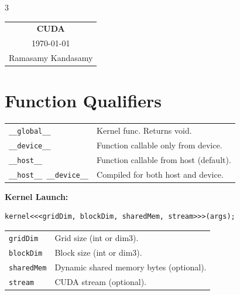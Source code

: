 



\raggedright
\footnotesize
\begin{multicols*}{3}
\setlength{\premulticols}{1pt}
\setlength{\postmulticols}{1pt}
\setlength{\multicolsep}{1pt}
\setlength{\columnsep}{2pt}

\begin{center}
\begin{tabular}{c}
\LARGE{\textbf{CUDA}}\\
\today\\
Ramasamy Kandasamy\\
\end{tabular}
\end{center}


\section*{Function Qualifiers}

\begin{tabularx}{\linewidth}{lX}
\texttt{\_\_global\_\_}               & Kernel func. Returns void. \\
\texttt{\_\_device\_\_}               & Function callable only from device. \\
\texttt{\_\_host\_\_}                 & Function callable from host (default). \\
\texttt{\_\_host\_\_ \_\_device\_\_}  & Compiled for both host and device.\\
\end{tabularx}

\textbf{Kernel Launch:} \texttt{}
\begin{mdframed}[nobreak=true,backgroundcolor=gray!10,linecolor=Firebrick4]
\begin{verbatim}
kernel<<<gridDim, blockDim, sharedMem, stream>>>(args);
\end{verbatim}
\end{mdframed}


\begin{tabularx}{\linewidth}{lX}
\texttt{gridDim}        & Grid size (int or dim3). \\
\texttt{blockDim}       & Block size (int or dim3). \\
\texttt{sharedMem}      & Dynamic shared memory bytes (optional). \\
\texttt{stream}         & CUDA stream (optional). \\
\end{tabularx}


\end{multicols*}

